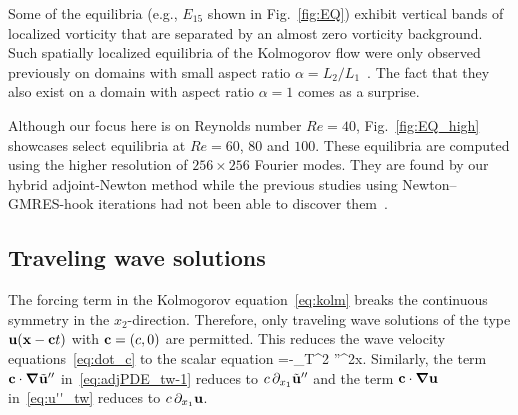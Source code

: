 \documentclass{jfm}
\begin{document}
Some of the equilibria (e.g., $E_{15}$ shown in Fig.~\ref{fig:EQ}) exhibit vertical bands
of localized vorticity that are separated by an almost zero vorticity background.
Such spatially localized equilibria of
the Kolmogorov flow were only observed previously on domains with small aspect ratio
$\alpha=L_2/L_1$~\citep{LK14}. The fact that they also exist on a domain with
aspect ratio $\alpha=1$ comes as a surprise.

Although our focus here is on Reynolds number $Re=40$,
Fig.~\ref{fig:EQ_high} showcases select equilibria
at $Re=60$, $80$ and $100$.
These equilibria are computed using the higher resolution of $256\times 256$ Fourier modes.
They are found by our hybrid adjoint-Newton method while
the previous studies using Newton--GMRES-hook iterations had not been
able to discover them~\citep{CK13}.

\subsection{Traveling wave solutions}
The forcing term in the Kolmogorov equation~\eqref{eq:kolm}
breaks the continuous symmetry in the $x_2$-direction. Therefore, only traveling wave
solutions of the type $\mathbf u(\mathbf x-\mathbf ct)$ with $\mathbf c=(c,0)$ are permitted.
This reduces the wave velocity equations~\eqref{eq:dot_c} to the scalar equation
\beq
{}=-\int_{\mathbb T^2}
\cdot{}''\;^2\vc x.
\eeq
Similarly, the term $\mathbf c\cdot\mbox{\boldmath $\nabla$}\tilde{\mathbf u}''$ in~\eqref{eq:adjPDE_tw-1} reduces to
$c\,\partial_{x_1}\tilde{\mathbf u}''$ and the term $\mathbf c\cdot\mbox{\boldmath $\nabla$}\mathbf u$
in~\eqref{eq:u''_tw} reduces to $c\,\partial_{x_1}\mathbf u$.
\end{document}
